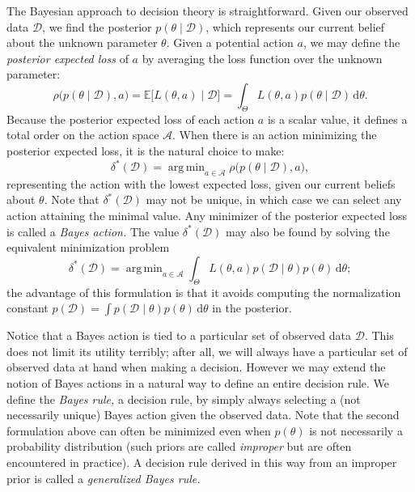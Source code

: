 \documentclass{article}
\newcommand{\given}{\mid}
\newcommand{\mc}[1]{\mathcal{#1}}
\newcommand{\data}{\mc{D}}
\newcommand{\intd}[1]{\,\mathrm{d}{#1}}
\DeclareMathOperator*{\argmin}{arg\,min}
\begin{document}
The Bayesian approach to decision theory is straightforward.  Given
our observed data $\data$, we find the posterior $p(\theta \given
\data)$, which represents our current belief about the unknown
parameter $\theta$.  Given a potential action $a$, we may define the
\emph{posterior expected loss} of $a$ by averaging the loss function
over the unknown parameter:
\begin{equation*}
  \rho\bigl(p(\theta \given \data), a\bigr)
  =
  \mathbb{E}\bigl[L(\theta, a) \given \data\bigr]
  =
  \int_{\Theta}
  L(\theta, a) p(\theta \given \data) \intd{\theta}.
\end{equation*}
Because the posterior expected loss of each action $a$ is a scalar
value, it defines a total order on the action space $\mc{A}$.  When
there is an action minimizing the posterior expected loss, it is the
natural choice to make:
\begin{equation*}
  \delta^\ast(\data) =
  \argmin_{a \in \mc{A}}
  \rho\bigl(p(\theta \given \data), a \bigr),
\end{equation*}
representing the action with the lowest expected loss, given our
current beliefs about $\theta$.  Note that $\delta^\ast(\data)$ may
not be unique, in which case we can select any action attaining the
minimal value.  Any minimizer of the posterior expected loss is called
a \emph{Bayes action.}  The value $\delta^\ast(\data)$ may also be
found by solving the equivalent minimization problem
\begin{equation*}
  \delta^\ast(\data) =
  \argmin_{a \in \mc{A}}
  \int_{\Theta}
  L(\theta, a)
  p(\data \given \theta) p(\theta) \intd{\theta};
\end{equation*}
the advantage of this formulation is that it avoids computing the
normalization constant $p(\data) = \int p(\data \given \theta)
p(\theta) \intd{\theta}$ in the posterior.

Notice that a Bayes action is tied to a particular set of observed
data $\data$.  This does not limit its utility terribly; after all, we
will always have a particular set of observed data at hand when making
a decision.  However we may extend the notion of Bayes actions in a
natural way to define an entire decision rule.  We define the
\emph{Bayes rule,} a decision rule, by simply always selecting a (not
necessarily unique) Bayes action given the observed data.  Note that
the second formulation above can often be minimized even when
$p(\theta)$ is not necessarily a probability distribution (such priors
are called \emph{improper} but are often encountered in practice).  A
decision rule derived in this way from an improper prior is called a
\emph{generalized Bayes rule.}
\end{document}
